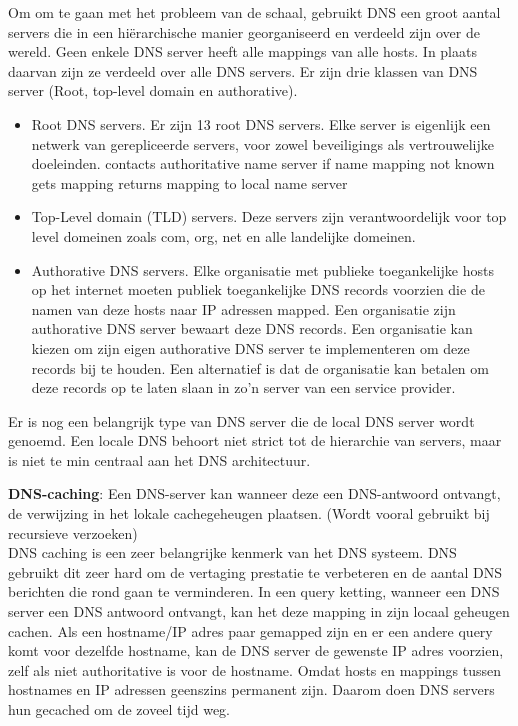 \clearpage


Om om te gaan met het probleem van de schaal, gebruikt DNS een groot aantal servers die in een hiërarchische manier georganiseerd en verdeeld zijn over de wereld. Geen enkele DNS server heeft alle mappings van alle hosts. In plaats daarvan zijn ze verdeeld over alle DNS servers. Er zijn drie klassen van DNS server (Root, top-level domain en authorative).

\begin{itemize}
    \item Root DNS servers. Er zijn 13 root DNS servers. Elke server is eigenlijk een netwerk van gerepliceerde servers, voor zowel beveiligings als vertrouwelijke doeleinden.
    \bi
    \itf contacts authoritative name server if name mapping not known
    \itf gets mapping
    \itf returns mapping to local name server
    \ei
\item Top-Level domain (TLD) servers. Deze servers zijn verantwoordelijk voor top level domeinen zoals com, org, net en alle landelijke domeinen.
\item Authorative DNS servers. Elke organisatie met publieke toegankelijke hosts op het internet moeten publiek toegankelijke DNS records voorzien die de namen van deze hosts naar IP adressen mapped. Een organisatie zijn authorative DNS server bewaart deze DNS records. Een organisatie kan kiezen om zijn eigen authorative DNS server te implementeren om deze records bij te houden. Een alternatief is dat de organisatie kan betalen om deze records op te laten slaan in zo’n server van een service provider.
\end{itemize}

Er is nog een belangrijk type van DNS server die de local DNS server wordt genoemd. Een locale DNS behoort niet strict tot de hierarchie van servers, maar is niet te min centraal aan het DNS architectuur. 


\textbf{DNS-caching}: Een DNS-server kan wanneer deze een DNS-antwoord ontvangt, de verwijzing in het lokale cachegeheugen plaatsen. (Wordt vooral gebruikt bij recursieve verzoeken)\\

\noindent DNS caching is een zeer belangrijke kenmerk van het DNS systeem. DNS gebruikt dit zeer hard om de vertaging prestatie te verbeteren en de aantal DNS berichten die rond gaan te verminderen. In een query ketting, wanneer een DNS server een DNS antwoord ontvangt, kan het deze mapping in zijn locaal geheugen cachen. Als een hostname/IP adres paar gemapped zijn en er een andere query komt voor dezelfde hostname, kan de DNS server de gewenste IP adres voorzien, zelf als niet authoritative is voor de hostname. Omdat hosts en mappings tussen hostnames en IP adressen geenszins permanent zijn. Daarom doen DNS servers hun gecached om de zoveel tijd weg.

